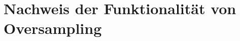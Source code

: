 \clearpage
\section{Nachweis der Funktionalität von Oversampling}\label{oversampling}
\begin{figure}[!b]\centering
    \begin{minipage}{0.5\textwidth}\centering
        \def\myConfMat{{
        { 140,    1,     1,    0,    6,    2},  %
        {   0,  798,     2,   29,    8,   63},  %
        {   3,    2,  1211,   37,   22,   75},  %
        {   1,   16,    21, 3062,   15,  185},  %
        {   4,    5,    16,   28, 1060,   87},  %
        {   1,   25,    42,  174,   36, 5722},  %
        }}

        \def\classNames{{1, 2, 3, 4, 5, 6}} %
        \def\numClasses{6} %
        \def\myScale{0.85} %

\end{minipage}
\end{figure}
